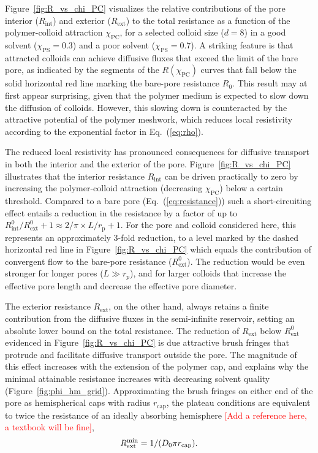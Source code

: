\documentclass[12pt, a4paper]{article}
\newcommand\todo[1]{\textcolor{red}{#1}}
\begin{document}
Figure~\ref{fig:R_vs_chi_PC} visualizes the relative contributions of the pore interior ($R_{\text{int}}$) and exterior ($R_{\text{ext}}$) to the total resistance as a function of the polymer-colloid attraction $\chi_\text{PC}$,
for a selected colloid size ($d = 8$) in a good solvent ($\chi_\text{PS} = 0.3$) and a poor solvent ($\chi_\text{PS} = 0.7$).
A striking feature is that attracted colloids can achieve diffusive fluxes that exceed the limit of the bare pore, as indicated by the segments of the $R(\chi_{\text{PC}})$ curves that fall below the solid horizontal red line marking the bare-pore resistance $R_{0}$.
This result may at first appear surprising, given that the polymer medium is expected to slow down the diffusion of colloids.
However, this slowing down is counteracted by the attractive potential of the polymer meshwork, which reduces local resistivity according to the exponential factor in Eq.~(\ref{eq:rho}).

The reduced local resistivity has pronounced consequences for diffusive transport in both the interior and the exterior of the pore.
Figure~\ref{fig:R_vs_chi_PC} illustrates that the interior resistance $R_{\text{int}}$ can be driven practically to zero by increasing the polymer-colloid attraction (decreasing $\chi_\text{PC}$) below a certain threshold.
Compared to a bare pore (Eq.~(\ref{eq:resistance})) such a short-circuiting effect entails a reduction in the resistance by a factor of up to $R^0_{\text{int}}/R^0_{\text{ext}}+1 \approx 2/\pi \times L / r_{\text{p}} + 1$.
For the pore and colloid considered here, this represents an approximately 3-fold reduction, to a level marked by the dashed horizontal red line in Figure~\ref{fig:R_vs_chi_PC} which equals the contribution of convergent flow to the bare-pore resistance ($R^0_\text{ext}$).
The reduction would be even stronger for longer pores ($L\gg r_p$), and for larger colloids that increase the effective pore length and decrease the effective pore diameter.

The exterior resistance $R_{\text{ext}}$, on the other hand, always retains a finite contribution from the diffusive fluxes in the semi-infinite reservoir, setting an absolute lower bound on the total resistance.
The reduction of $R_{\text{ext}}$ below $R^0_\text{ext}$ evidenced in Figure~\ref{fig:R_vs_chi_PC} is due attractive brush fringes that protrude and facilitate diffusive transport outside the pore.
The magnitude of this effect increases with the extension of the polymer cap, and explains why the minimal attainable resistance increases with decreasing solvent quality (Figure~\ref{fig:phi_hm_grid}).
Approximating the brush fringes on either end of the pore as hemispherical caps with radius $r_\text{cap}$, the plateau conditions are equivalent to twice the resistance of an ideally absorbing hemisphere
\todo{[Add a reference here, a textbook will be fine]},
\begin{equation}
    R_\text{ext}^\text{\text{min}} = 1 / (D_0 \pi r_\text{cap}).
    \label{eq:R_ext_min}
\end{equation}
\end{document}
